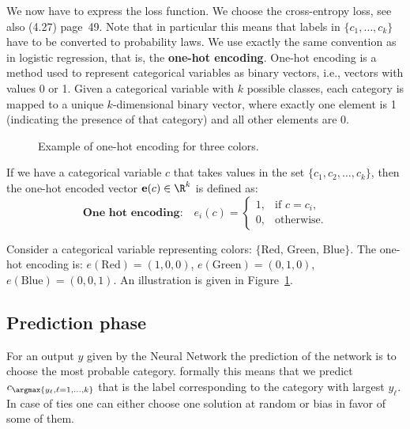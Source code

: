 We now have to express the loss function. We choose the cross-entropy loss, see also (4.27) page~49. Note that in particular this means that labels in $\{c_1, \ldots, c_k\}$ have to be converted to probability laws. We use exactly the same convention as in logistic regression, that is, the \textbf{one-hot encoding}. One-hot encoding is a method used to represent categorical variables as binary vectors, i.e., vectors with values 0 or 1. Given a categorical variable with $k$ possible classes, each category is mapped to a unique $k$-dimensional binary vector, where exactly one element is 1 (indicating the presence of that category) and all other elements are 0.

\begin{figure}[h]\centering
\caption{Example of one-hot encoding for three colors.}\label{fig:ch7-onehot}
\end{figure}

If we have a categorical variable $c$ that takes values in the set $\{c_1, c_2, \ldots, c_k\}$, then the one-hot encoded vector $\mathbf{e}(c) \in \R^k$ is defined as:
\begin{equation}\label{eq:ch7-onehot-def}
  \textbf{One hot encoding:}\quad e_i(c) = \begin{cases} 1, & \text{if } c = c_i, \\ 0, & \text{otherwise.} \end{cases}
\end{equation}

\begin{example}\label{ex:ch7-onehot-colors}
Consider a categorical variable representing colors: $\{\text{Red, Green, Blue}\}$. The one-hot encoding is: $e(\text{Red}) = (1, 0, 0)$, $e(\text{Green}) = (0, 1, 0)$, $e(\text{Blue}) = (0, 0, 1)$. An illustration is given in Figure~\ref{fig:ch7-onehot}.
\end{example}

\subsection{Prediction phase}

For an output $y$ given by the Neural Network the prediction of the network is to choose the most probable category. formally this means that we predict $c_{\argmax\{y_\ell, \ell = 1, \ldots, k\}}$ that is the label corresponding to the category with largest $y_\ell$. In case of ties one can either choose one solution at random or bias in favor of some of them.

